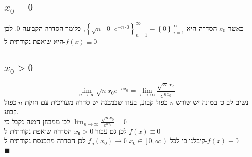 \documentclass[12pt, titlepage]{article}
\begin{document}
\subsection*{$x_0 = 0$}
כאשר $x_0$ הסדרה היא $\left\{\sqrt{n}\cdot 0 \cdot e^{-n \cdot 0}\right\}^\infty_{n=1}=\left\{0\right\}^\infty_{n=1}$, כלומר הסדרה הקבועה $0$, לכן היא שואפת נקודתית ל-$f\left(x\right) \equiv 0$
\subsection*{$x_0 > 0$}
\[
    \lim_{n\to\infty} \sqrt{n}x_0 e^{-nx_0} = \lim_{n\to\infty} \frac{\sqrt{n}x_0}{e^{nx_0}}
\]
נשים לב כי במונה יש שורש $n$ כפול קבוע, בעוד שבמכנה יש סדרה מעריכית עם חזקת $n$ כפול קבוע. \\
לכן ממבחן המנה נקבל כי $\lim_{n\to\infty} \frac{\sqrt{n}x_0}{e^{nx_0}} =0$ \\
לכן גם עבור $x_0 > 0$ הסדרה שואפת נקודתית ל-$f\left(x\right) \equiv 0$\\
קיבלנו כי לכל $x_0 \in \left[0,\infty\right)$ $f_n\left(x_0\right) \to 0$ לכן הסדרה מתכנסת נקודתית ל-$f\left(x\right) \equiv 0$\\
$\blacksquare$
\end{document}
